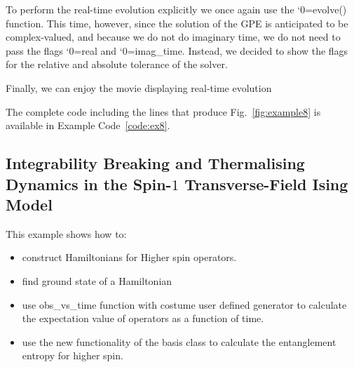 \documentclass{SciPost}
\newcommand\0{\scalebox{-1}[1]{0}}
\let\svttfamily\ttfamily
\renewcommand\ttfamily{\svttfamily\catcode`0=\active }
\renewcommand\texttt{\bgroup\ttfamily\texttthelp}
\def\texttthelp#1{#1\egroup}
\newcommand{\GPcode}{example4.py}
\begin{document}

To perform the real-time evolution explicitly we once again use the \texttt{evolve()} function. This time, however, since the solution of the GPE is anticipated to be complex-valued, and because we do not do imaginary time, we do not need to pass the flags \texttt{real} and \texttt{imag\_time}. Instead, we decided to show the flags for the relative and absolute tolerance of the solver. 

Finally, we can enjoy the movie displaying real-time evolution


The complete code including the lines that produce Fig.~\ref{fig:example8} is available in Example Code~\ref{code:ex8}.



\subsection{Integrability Breaking and Thermalising Dynamics in the Spin-$1$ Transverse-Field Ising Model}

This example shows how to:
\begin{itemize}
	\item construct Hamiltonians for Higher spin operators.
	\item find ground state of a Hamiltonian
	\item use obs\_vs\_time function with costume user defined generator to calculate the expectation value of operators as a function of time.
	\item use the new functionality of the basis class to calculate the entanglement entropy for higher spin.
\end{itemize}
\end{document}
